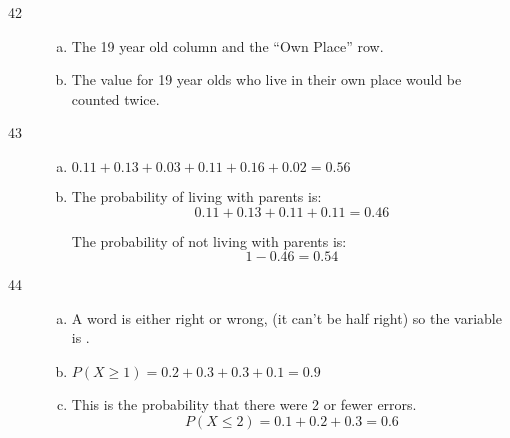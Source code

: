 \documentclass[letterpaper, landscape]{exam}
\begin{document}
\begin{description}
\begin{enumerate}[(a)]
        \end{enumerate}

      \item[42]
        \begin{enumerate}[(a)]
          \item The 19 year old column and the ``Own Place'' row.

          \item The value for 19 year olds who live in their own place would be
            counted twice.

        \end{enumerate}  

      \item[43]
        \begin{enumerate}[(a)]
          \item $0.11 + 0.13 + 0.03 + 0.11 + 0.16 + 0.02 = \boxed{ 0.56 }$

          \item The probability of living with parents is:
            \[
              0.11 + 0.13 + 0.11 + 0.11 = 0.46
            \]

            The probability of not living with parents is:
            \[
              1 - 0.46 = \boxed{ 0.54 }
            \]
        \end{enumerate}  

      \item[44]
        \begin{enumerate}[(a)]
          \item A word is either right or wrong, (it can't be half right) so the
            variable is .

          \item $P(X \geq 1) = 0.2 + 0.3 + 0.3 + 0.1 = \boxed{ 0.9 }$

          \item This is the probability that there were 2 or fewer errors.
          \[
            P(X \leq 2) = 0.1 + 0.2 + 0.3 = \boxed{ 0.6 }
          \]
        \end{enumerate}  



\end{description}
\end{document}
